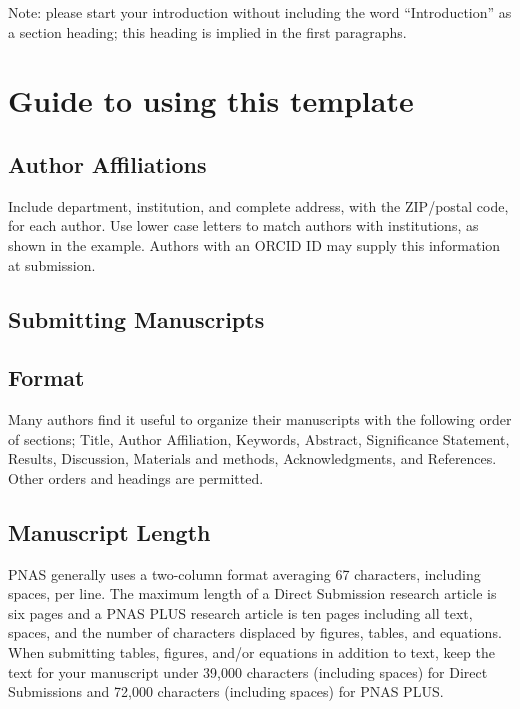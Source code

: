 \documentclass[9pt,twocolumn,twoside,]{pnas-new}
\begin{document}
Note: please start your introduction without including the word
``Introduction'' as a section heading; this heading is implied in the
first paragraphs.

\section*{Guide to using this
template}\label{guide-to-using-this-template}

\subsection*{Author Affiliations}\label{author-affiliations}

Include department, institution, and complete address, with the
ZIP/postal code, for each author. Use lower case letters to match
authors with institutions, as shown in the example. Authors with an
ORCID ID may supply this information at submission.

\subsection*{Submitting Manuscripts}\label{submitting-manuscripts}

\subsection*{Format}\label{format}

Many authors find it useful to organize their manuscripts with the
following order of sections; Title, Author Affiliation, Keywords,
Abstract, Significance Statement, Results, Discussion, Materials and
methods, Acknowledgments, and References. Other orders and headings are
permitted.

\subsection*{Manuscript Length}\label{manuscript-length}

PNAS generally uses a two-column format averaging 67 characters,
including spaces, per line. The maximum length of a Direct Submission
research article is six pages and a PNAS PLUS research article is ten
pages including all text, spaces, and the number of characters displaced
by figures, tables, and equations. When submitting tables, figures,
and/or equations in addition to text, keep the text for your manuscript
under 39,000 characters (including spaces) for Direct Submissions and
72,000 characters (including spaces) for PNAS PLUS.
\end{document}
